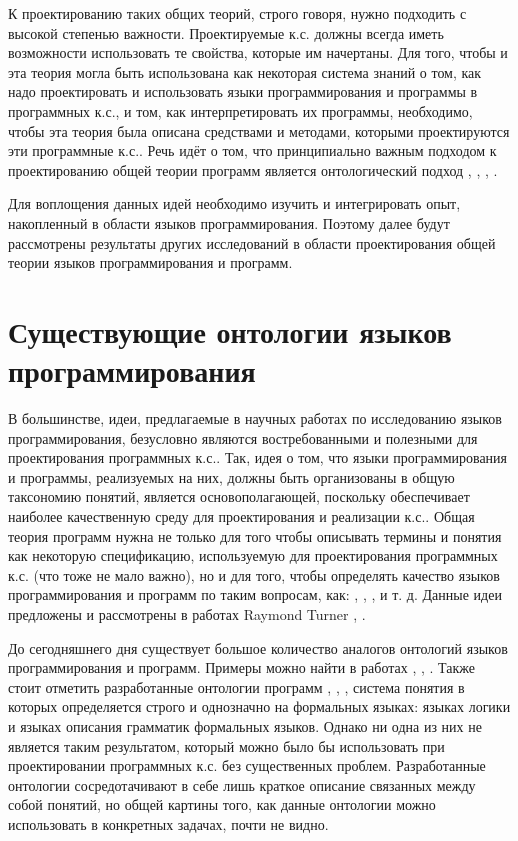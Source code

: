 К проектированию таких общих теорий, строго говоря, нужно подходить с высокой степенью важности. Проектируемые к.с. должны всегда иметь возможности использовать те свойства, которые им начертаны. Для того, чтобы и эта теория могла быть использована как некоторая система знаний о том, как надо проектировать и использовать языки программирования и программы в программных к.с., и том, как интерпретировать их программы, необходимо, чтобы эта теория была описана средствами и методами, которыми проектируются эти программные к.с.. Речь идёт о том, что принципиально важным подходом к проектированию общей теории программ является онтологический подход \cite{Zapata2010}, \cite{Golenkov2019}, \cite{Sales2022}, \cite{Samaa2020}.

Для воплощения данных идей необходимо изучить и интегрировать опыт, накопленный в области языков программирования. Поэтому далее будут рассмотрены результаты других исследований в области проектирования общей теории языков программирования и программ.

\section{Существующие онтологии языков программирования}

В большинстве, идеи, предлагаемые в научных работах по исследованию языков программирования, безусловно являются востребованными и полезными для проектирования программных к.с.. Так, идея о том, что языки программирования и программы, реализуемых на них, должны быть организованы в общую таксономию понятий, является основополагающей, поскольку обеспечивает наиболее качественную среду для проектирования и реализации к.с.. Общая теория программ нужна не только для того чтобы описывать термины и понятия как некоторую спецификацию, используемую для проектирования программных к.с. (что тоже не мало важно), но и для того, чтобы определять качество языков программирования и программ по таким вопросам, как: , , ,  и т. д. Данные идеи предложены и рассмотрены в работах Raymond Turner \cite{Eden2007}, \cite{Turner2012}.

До сегодняшнего дня существует большое количество аналогов онтологий языков программирования и программ. Примеры можно найти в работах \cite{Lando2007}, \cite{Lando2009}, \cite{Turner2007}.  Также стоит отметить разработанные онтологии программ \cite{Turner2012}, \cite{Turner2014}, \cite{Jacobs2022}, система понятия в которых определяется строго и однозначно на формальных языках: языках логики и языках описания грамматик формальных языков. Однако ни одна из них не является таким результатом, который можно было бы использовать при проектировании программных к.с. без существенных проблем. Разработанные онтологии сосредотачивают в себе лишь краткое описание связанных между собой понятий, но общей картины того, как данные онтологии можно использовать в конкретных задачах, почти не видно.

